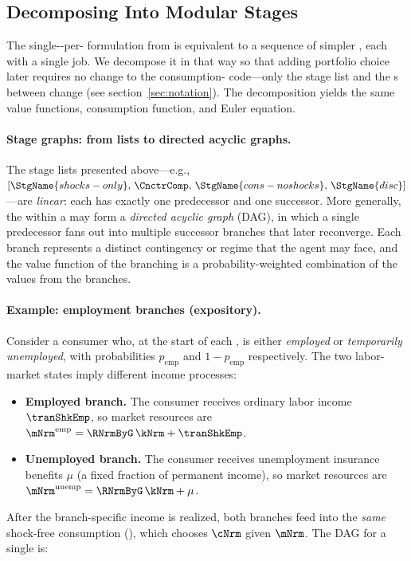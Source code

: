 \documentclass[SolvingMicroDSOPs]{subfiles}
\begin{document}
\hypertarget{stages-within-a-period}{}
\subsection{Decomposing Into Modular Stages}\label{subsec:stageswithin}

The single-{\stg}-per-{\interval} formulation from  is equivalent to a sequence of simpler {\stgs}, each with a single job.  We decompose it in that way so that adding portfolio choice later requires no change to the consumption-{\stg} code---only the stage list and the {\Cnct}s between {\stgs} change (see section~\ref{sec:notation}).  The decomposition yields the same value functions, consumption function, and Euler equation.

\paragraph{Stage graphs: from lists to directed acyclic graphs.}
The stage lists presented above---e.g.,
$[\StgName{shocks-only},\, \CnctrComp,\, \StgName{cons-noshocks},\, \StgName{disc}]$---are
\textit{linear}: each {\stg} has exactly one predecessor and one successor.
More generally, the {\stgs} within a {\interval} may form a \textit{directed
acyclic graph} (DAG), in which a single predecessor {\stg} fans out into
multiple successor branches that later reconverge. Each branch represents a
distinct contingency or regime that the agent may face, and the {\Arrival}
value function of the branching {\stg} is a probability-weighted combination
of the {\Arrival} values from the branches.

\paragraph{Example: employment branches (expository).}
Consider a consumer who, at the start of each {\interval}, is either
\textit{employed} or \textit{temporarily unemployed}, with probabilities
$p_{\text{emp}}$ and $1 - p_{\text{emp}}$ respectively. The two labor-market
states imply different income processes:
\begin{itemize}
  \item \textbf{Employed branch.} The consumer receives ordinary labor income
    $\tranShkEmp$, so market resources are
    $\mNrm^{\text{emp}} = \RNrmByG\,\kNrm + \tranShkEmp$.
  \item \textbf{Unemployed branch.} The consumer receives unemployment
    insurance benefits $\mu$ (a fixed fraction of permanent income), so
    market resources are
    $\mNrm^{\text{unemp}} = \RNrmByG\,\kNrm + \mu$.
\end{itemize}
After the branch-specific income is realized, both branches feed into the
\textit{same} shock-free consumption {\stg} (),
which chooses $\cNrm$ given $\mNrm$. The DAG for a single {\interval} is:
\end{document}
